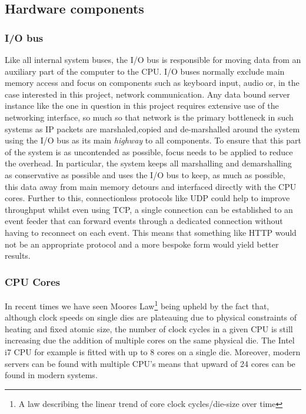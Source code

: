 \documentclass[a4paper,11pt]{scrreprt}
\begin{document}
\subsection{Hardware components}
\subsubsection{I/O bus}
Like all internal system buses, the I/O bus is responsible for moving data from an auxiliary part of the computer to the CPU. I/O buses normally exclude main memory access and focus on components such as keyboard input, audio or, in the case interested in this project, network communication. Any data bound server instance like the one in question in this project requires extensive use of the networking interface, so much so that network is the primary bottleneck in such systems as IP packets are marshaled,copied and de-marshalled around the system using the I/O bus as its main \textit{highway} to all components. To ensure that this part of the system is as uncontended as possible, focus needs to be applied to reduce the overhead. In particular, the system keeps all marshalling and demarshalling as conservative as possible and uses the I/O bus to keep, as much as possible, this data away from main memory detours and interfaced directly with the CPU cores. Further to this, connectionless protocols like UDP could help to improve throughput whilst even using TCP, a single connection can be established to an event feeder that can forward events through a dedicated connection without having to reconnect on each event. This means that something like HTTP would not be an appropriate protocol and a more bespoke form would yield better results.
\subsubsection{CPU Cores}
In recent times we have seen Moores Law\footnote{A law describing the linear trend of core clock cycles/die-size over time} being upheld by the fact that, although clock speeds on single dies are plateauing due to physical constraints of heating and fixed atomic size, the number of clock cycles in a given CPU is still increasing due the addition of multiple cores on the same physical die. The Intel i7 CPU for example is fitted with up to 8 cores on a single die. Moreover, modern servers can be found with multiple CPU's means that upward of 24 cores can be found in modern systems.
\end{document}
